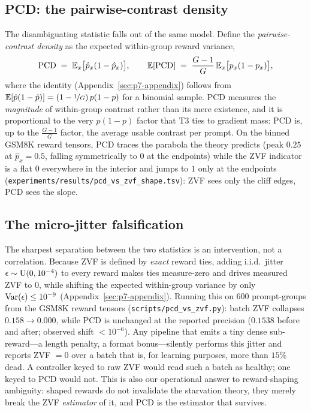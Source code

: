 \subsection{PCD: the pairwise-contrast density}
\label{sec:p7-pcd}
The disambiguating statistic falls out of the same model. Define the
\emph{pairwise-contrast density} as the expected within-group reward
variance,
\begin{equation}
  \mathrm{PCD} \;=\; \mathbb{E}_x\bigl[\hat p_x(1 - \hat p_x)\bigr],
  \qquad
  \mathbb{E}[\mathrm{PCD}] \;=\; \frac{G-1}{G}\,\mathbb{E}_x\bigl[p_x(1-p_x)\bigr],
  \label{eq:p7-pcd}
\end{equation}
where the identity (Appendix~\ref{sec:p7-appendix}) follows from
$\mathbb{E}[\hat p(1-\hat p)] = (1 - \nicefrac{1}{G})\,p(1-p)$ for a binomial
sample. PCD measures the \emph{magnitude} of within-group contrast rather
than its mere existence, and it is proportional to the very $p(1-p)$ factor
that T3 ties to gradient mass: PCD is, up to the $\frac{G-1}{G}$ factor, the
average usable contrast per prompt. On the binned GSM8K reward tensors, PCD
traces the parabola the theory predicts (peak $0.25$ at $\hat p_x = 0.5$,
falling symmetrically to $0$ at the endpoints) while the ZVF indicator is a
flat $0$ everywhere in the interior and jumps to $1$ only at the endpoints
(\texttt{experiments/results/pcd\_vs\_zvf\_shape.tsv}): ZVF sees only the
cliff edges, PCD sees the slope.

\subsection{The micro-jitter falsification}
\label{sec:p7-jitter}
The sharpest separation between the two statistics is an intervention, not a
correlation. Because ZVF is defined by \emph{exact} reward ties, adding
i.i.d.\ jitter $\epsilon \sim \mathrm{U}(0, 10^{-4})$ to every reward makes ties
measure-zero and drives measured ZVF to $0$, while shifting the expected
within-group variance by only $\mathrm{Var}(\epsilon) \leq 10^{-9}$
(Appendix~\ref{sec:p7-appendix}). Running this on $600$ prompt-groups from
the GSM8K reward tensors (\texttt{scripts/pcd\_vs\_zvf.py}): batch ZVF
collapses $0.158 \to 0.000$, while PCD is unchanged at the reported
precision ($0.1538$ before and after; observed shift $< 10^{-6}$). Any
pipeline that emits a tiny dense sub-reward---a length penalty, a format
bonus---silently performs this jitter and reports ZVF $= 0$ over a batch
that is, for learning purposes, more than $15\%$ dead. A controller keyed to
raw ZVF would read such a batch as healthy; one keyed to PCD would not. This
is also our operational answer to reward-shaping ambiguity: shaped rewards
do not invalidate the starvation theory, they merely break the ZVF
\emph{estimator} of it, and PCD is the estimator that survives.

